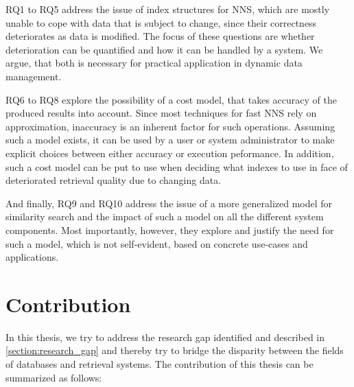 RQ1 to RQ5 address the issue of index structures for NNS, which are mostly unable to cope with data that is subject to change, since their correctness deteriorates as data is modified. The focus of these questions are whether deterioration can be quantified and how it can be handled by a system. We argue, that both is necessary for practical application in dynamic data management.

RQ6 to RQ8 explore the possibility of a cost model, that takes accuracy of the produced results into account. Since most techniques for fast NNS rely on approximation, inaccuracy is an inherent factor for such operations. Assuming such a model exists, it can be used by a user or system administrator to make explicit choices between either accuracy or execution peformance. In addition, such a cost model can be put to use when deciding what indexes to use in face of deteriorated retrieval quality due to changing data.

And finally, RQ9 and RQ10 address the issue of a more generalized model for similarity search and the impact of such a model on all the different system components. Most importantly, however, they explore and justify the need for such a model, which is not self-evident, based on concrete use-cases and applications.

\section{Contribution}

In this thesis, we try to address the research gap identified and described in \cref{section:research_gap} and thereby try to bridge the disparity between the fields of databases and retrieval systems. The contribution of this thesis can be summarized as follows:

